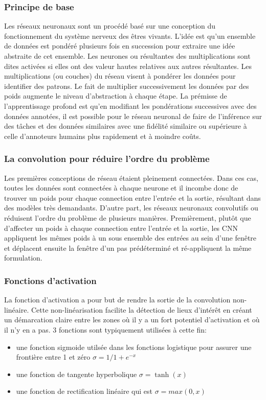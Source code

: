 \subsubsection{Principe de base}
Les réseaux neuronaux sont un procédé basé sur une conception du fonctionnement du système nerveux des êtres vivants. L'idée est qu'un ensemble de données est pondéré plusieurs fois en succession pour extraire une idée abstraite de cet ensemble. Les neurones ou résultantes des multiplications sont dites activées si elles ont des valeur hautes relatives aux autres résultantes. Les multiplications (ou couches) du réseau visent à pondérer les données pour identifier des patrons. Le fait de multiplier successivement les données par des poids augmente le niveau d'abstraction à chaque étape. La prémisse de l'apprentissage profond est qu'en modifiant les pondérations successives avec des données annotées, il est possible pour le réseau neuronal de faire de l'inférence sur des tâches et des données similaires avec une fidélité similaire ou supérieure à celle d'annoteurs humains plus rapidement et à moindre coûts. \par
\subsubsection{La convolution pour réduire l'ordre du problème}
Les premières conceptions de réseau étaient pleinement connectées. Dans ces cas, toutes les données sont connectées à chaque neurone et il incombe donc de trouver un poids pour chaque connection entre l'entrée et la sortie, résultant dans des modèles très demandants. D'autre part,  les réseaux neuronaux convolutifs ou \fg{} réduisent l'ordre du problème de plusieurs manières. Premièrement, plutôt que d'affecter un poids à chaque connection entre l'entrée et la sortie, les \ac{CNN} appliquent les mêmes poids à un sous ensemble des entrées au sein d'une fenêtre et déplacent ensuite la fenêtre d'un pas prédéterminé et ré-appliquent la même formulation.\par
\subsubsection{Fonctions d'activation}
La fonction d'activation a pour but de rendre la sortie de la convolution non-linéaire. Cette non-linéarisation facilite la détection de lieux d'intérêt en créant un démarcation claire entre les zones où il y a un fort potentiel d'activation et où il n'y en a pas. 3 fonctions sont typiquement utilisées à cette fin: 
  \begin{itemize}
    \item une fonction sigmoide utilsée dans les fonctions logistique pour assurer une frontière entre 1 et zéro $\sigma = 1/1+ e^{-x} $
    \item une fonction de tangente hyperbolique $\sigma = \tanh(x) $ 
    \item une fonction de rectification linéaire qui est $\sigma = max(0,x) $
  \end{itemize}
  
